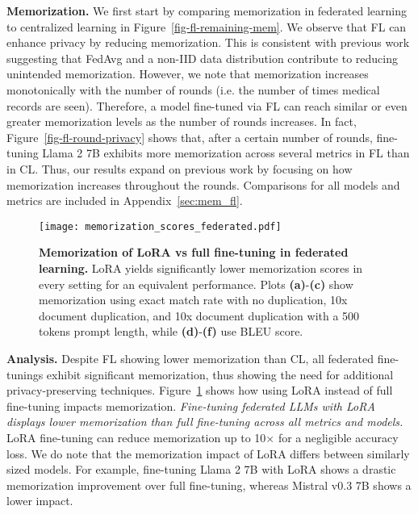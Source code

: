 \textbf{Memorization.} We first start by comparing memorization in federated learning to centralized learning in Figure~\ref{fig-fl-remaining-mem}. We observe that FL can enhance privacy by reducing memorization. This is consistent with previous work \citep{thakkar2020understanding} suggesting that FedAvg and a non-IID data distribution contribute to reducing unintended memorization. However, we note that memorization increases monotonically with the number of rounds (i.e. the number of times medical records are seen). Therefore, a model fine-tuned via FL can reach similar or even greater memorization levels as the number of rounds increases. In fact, Figure~\ref{fig-fl-round-privacy} shows that, after a certain number of rounds, fine-tuning Llama 2 7B exhibits more memorization across several metrics in FL than in CL. Thus, our results expand on previous work by focusing on how memorization increases throughout the rounds. Comparisons for all models and metrics are included in Appendix~\ref{sec:mem_fl}.

\begin{figure}[ht]
\vskip 0.2in
\begin{center}
\centerline{\texttt{[image: memorization\_scores\_federated.pdf]}}
\caption{\textbf{Memorization of LoRA vs full fine-tuning in federated learning.} LoRA yields
significantly lower memorization scores in every setting for an equivalent performance. Plots \textbf{(a)}-\textbf{(c)} show memorization using exact match rate with no duplication, 10x document duplication, and 10x document duplication with a 500 tokens prompt length, while \textbf{(d)}-\textbf{(f)} use BLEU score.}
\label{fig-fl-privacy}
\end{center}
\vskip -0.2in
\end{figure}

\textbf{Analysis.} Despite FL showing lower memorization than CL, all federated fine-tunings exhibit significant memorization, thus showing the need for additional privacy-preserving techniques. Figure~\ref{fig-fl-privacy} shows how using LoRA instead of full fine-tuning impacts memorization. \textit{Fine-tuning federated LLMs with LoRA displays lower memorization than full fine-tuning across all metrics and models.} LoRA fine-tuning can reduce memorization up to 10$\times$ for a negligible accuracy loss. We do note that the memorization impact of LoRA differs between similarly sized models. For example, fine-tuning Llama 2 7B with LoRA shows a drastic memorization improvement over full fine-tuning, whereas Mistral v0.3 7B shows a lower impact.

